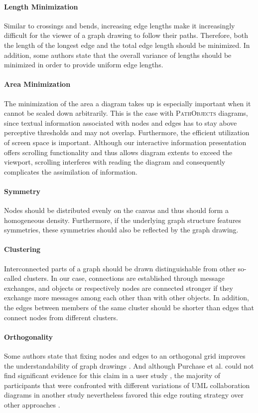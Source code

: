 \paragraph{Length Minimization} Similar to crossings and bends, increasing edge lengths make it increasingly difficult for the viewer of a graph drawing to follow their paths.
Therefore, both the length of the longest edge and the total edge length should be minimized.
In addition, some authors state that the overall variance of lengths should be minimized in order to provide uniform edge lengths.

\paragraph{Area Minimization} The minimization of the area a diagram takes up is especially important when it cannot be scaled down arbitrarily.
This is the case with \textsc{PathObjects} diagrams, since textual information associated with nodes and edges has to stay above perceptive thresholds and may not overlap.
Furthermore, the efficient utilization of screen space is important.
Although our interactive information presentation offers scrolling functionality and thus allows diagram extents to exceed the viewport, scrolling interferes with reading the diagram and consequently complicates the assimilation of information.

\paragraph{Symmetry} Nodes should be distributed evenly on the canvas and thus should form a homogeneous density.
Furthermore, if the underlying graph structure features symmetries, these symmetries should also be reflected by the graph drawing.

\paragraph{Clustering} Interconnected parts of a graph should be drawn distinguishable from other so-called clusters.
In our case, connections are established through message exchanges, and objects or respectively nodes are connected stronger if they exchange more messages among each other than with other objects.
In addition, the edges between members of the same cluster should be shorter than edges that connect nodes from different clusters.

\paragraph{Orthogonality} Some authors state that fixing nodes and edges to an orthogonal grid improves the understandability of graph drawings \cite{sugiyama_methods_1981, batini_what_1985}.
And although Purchase et al. could not find significant evidence for this claim in a user study \cite{purchase_which_1997}, the majority of participants that were confronted with different variations of UML collaboration diagrams in another study nevertheless favored this edge routing strategy over other approaches \cite{purchase_graph_2004}.

